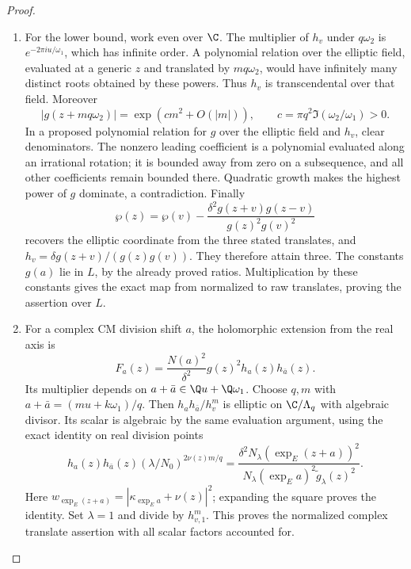 \begin{proof}
\begin{enumerate}[label=\arabic*.,leftmargin=0pt,labelsep=.5em]
\begin{enumerate}[label=(\alph*),leftmargin=1.3em,labelsep=.5em]
\item  For the lower bound, work even over $\C$. The multiplier of
$h_v$ under $q\omega_2$ is $e^{-2\pi iu/\omega_1}$,
which has infinite order. A polynomial relation over the elliptic
field, evaluated at a generic $z$ and translated by $mq\omega_2$,
would have infinitely many distinct roots obtained by these
powers. Thus $h_v$ is transcendental over that field. Moreover
\[
 |g(z+mq\omega_2)|=\exp(c m^2+O(|m|)),
 \qquad c=\pi q^2\Im(\omega_2/\omega_1)>0.
\]
In a proposed polynomial relation for $g$ over the elliptic field
and $h_v$, clear denominators. The nonzero leading coefficient
is a polynomial evaluated along an irrational rotation; it is
bounded away from zero on a subsequence, and all other
coefficients remain bounded there. Quadratic growth makes the
highest power of $g$ dominate, a contradiction. Finally
\[
 \wp(z)=\wp(v)-
 \frac{\delta^2g(z+v)g(z-v)}{g(z)^2g(v)^2}
\]
recovers the elliptic coordinate from the three stated translates,
and $h_v=\delta g(z+v)/(g(z)g(v))$. They therefore attain three.
The constants $g(a)$ lie in $L$, by the already proved ratios.
Multiplication by these constants gives the exact map from
normalized to raw translates, proving the assertion over $L$.


\item  For a complex CM division shift $a$, the holomorphic extension
from the real axis is
\[
 F_a(z)=\frac{N(a)^2}{\delta^2}g(z)^2h_a(z)h_{\bar a}(z).
\]
Its multiplier depends on $a+\bar a\in\Q u+\Q\omega_1$.
Choose $q,m$ with $a+\bar a=(mu+k\omega_1)/q$.
Then $h_ah_{\bar a}/h_v^m$ is elliptic on $\C/\Lambda_q$
with algebraic divisor. Its scalar is algebraic by the same
evaluation argument, using the exact identity on real division
points
\[
 h_a(z)h_{\bar a}(z)(\lambda/N_0)^{2\nu(z)m/q}
 =\frac{\delta^2N_\lambda(\exp_E(z+a))^2}
        {N_\lambda(\exp_Ea)^2\widetilde g_\lambda(z)^2}.
\]
Here $w_{\exp_E(z+a)}=|\kappa_{\exp_Ea}+\nu(z)|^2$;
expanding the square proves the identity. Set $\lambda=1$
and divide by $h_{v,1}^m$. This proves the normalized complex
translate assertion with all scalar factors accounted for.

 
\end{enumerate}


\end{enumerate}
\end{proof}
